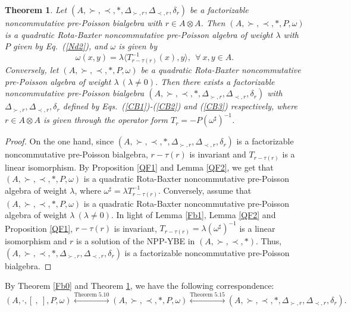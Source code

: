 \documentclass[12pt]{amsart}
\newtheorem{thm}{Theorem}[section]
\theoremstyle{definition}
\begin{document}
\begin{thm} \label{Fb3} Let $(A, \succ,\prec,\ast, \Delta_{\succ,r}, \Delta_{\prec,r},\delta_{r})$ be a factorizable 
noncommutative pre-Poisson bialgebra
with $r\in A\otimes A$. Then $(A,\succ,\prec,\ast, P,\omega)$
 is a quadratic Rota-Baxter noncommutative pre-Poisson algebra of weight $\lambda$ with $P$ given by Eq.~(\ref{Nd2}), and $\omega$ is given by
\begin{equation} \label{Nd6} \omega(x,y)=\lambda\langle T_{r-\tau(r)}^{-1}(x),y \rangle,~~\forall~x,y\in A.\end{equation}
Conversely, let $(A,\succ,\prec,\ast,P,\omega)$ be a quadratic Rota-Baxter noncommutative pre-Poisson algebra of weight $\lambda~(\lambda\neq 0)$.
Then there exists a factorizable noncommutative pre-Poisson bialgebra $(A, \succ,\prec,\ast,  \Delta_{\succ,r}, \Delta_{\prec,r},\delta_{r})$
 with $\Delta_{\succ,r}, \Delta_{\prec,r},\delta_{r}$ defined by Eqs.~(\ref{CB1})-(\ref{CB2}) and (\ref{CB3}) respectively, where $r\in A\otimes A$ is
given through the operator form $T_r=-P(\omega^{\sharp})^{-1}$.
\end{thm}

\begin{proof} On the one hand, since $(A, \succ,\prec,\ast, \Delta_{\succ,r}, \Delta_{\prec,r},\delta_{r})$ is a factorizable 
noncommutative pre-Poisson bialgebra, $r-\tau(r)$ is invariant and $T_{r-\tau(r)}$ is a linear isomorphism. 
By Proposition \ref{QF1} and Lemma \ref{QF2}, we get that $(A,\succ,\prec,\ast,P,\omega)$
 is a quadratic Rota-Baxter noncommutative pre-Poisson algebra of weight $\lambda$, where $\omega^{\sharp}=\lambda T_{r-\tau(r)}^{-1}$. 
 Conversely, assume that $(A,\succ,\prec,\ast,P,\omega)$ is a quadratic Rota-Baxter noncommutative 
 pre-Poisson algebra of weight $\lambda~(\lambda\neq 0)$.
 In light of Lemma \ref{Fb1},  Lemma \ref{QF2} and Proposition \ref{QF1}, 
 $r-\tau(r)$ is invariant, $T_{r-\tau(r)}=\lambda (\omega^{\sharp})^{-1}$ is a linear isomorphism
 and $r$ is a solution of the NPP-YBE in $(A, \succ,\prec,\ast)$. Thus,
  $(A, \succ,\prec,\ast, \Delta_{\succ,r}, \Delta_{\prec,r},\delta_{r})$ is a factorizable noncommutative pre-Poisson bialgebra.
\end{proof}

By Theorem \ref{Fb0} and Theorem \ref{Fb3}, we have the following correspondence:
\[(A, \cdot, [ \ , \ ], P, \omega){\overset{\text{Theorem 5.10}}{\longleftrightarrow}} 
(A, \succ,\prec,\ast, P, \omega){\overset{\text{Theorem 5.15}}{\longleftrightarrow}}(A, \succ,\prec,\ast, \Delta_{\succ,r}, \Delta_{\prec,r}, \delta_r).\]
\end{document}
